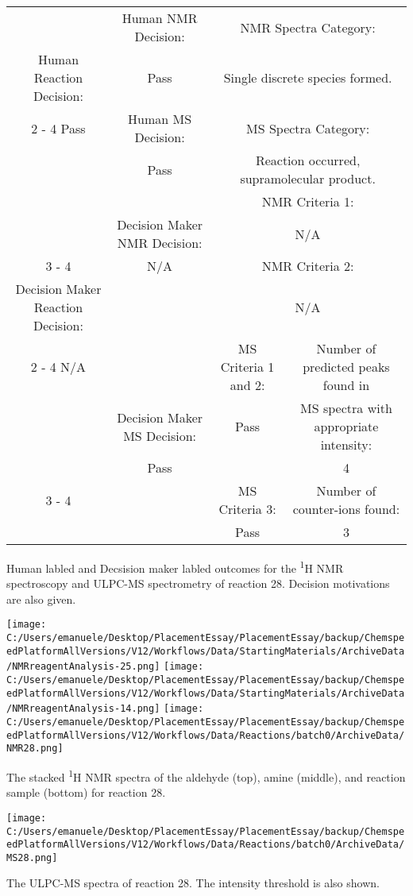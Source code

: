 \documentclass{article}%
\begin{document}
\begin{Decision Table}[H]%
\begin{tabular}{|c|c|c|c|}%
\hline%
&Human NMR Decision:&\multicolumn{2}{|c|}{NMR Spectra Category:}\\%
Human Reaction Decision:&Pass&\multicolumn{2}{|c|}{Single discrete species formed.}\\%
\cline{2%
-%
4}%
Pass&Human MS Decision:&\multicolumn{2}{|c|}{MS Spectra Category:}\\%
&Pass&\multicolumn{2}{|c|}{Reaction occurred, supramolecular product.}\\%
\hline%
&&\multicolumn{2}{|c|}{NMR Criteria 1:}\\%
&Decision Maker NMR Decision:&\multicolumn{2}{|c|}{N/A}\\%
\cline{3%
-%
4}%
&N/A&\multicolumn{2}{|c|}{NMR Criteria 2:}\\%
Decision Maker Reaction Decision:&&\multicolumn{2}{|c|}{N/A}\\%
\cline{2%
-%
4}%
N/A&&MS Criteria 1 and 2:&Number of predicted peaks found in\\%
&Decision Maker MS Decision:&Pass&MS spectra with appropriate intensity:\\%
&Pass&&4\\%
\cline{3%
-%
4}%
&&MS Criteria 3:&Number of counter{-}ions found:\\%
&&Pass&3\\%
\hline%
\end{tabular}%
\caption{Human labled and Decsision maker labled outcomes for the \textsuperscript{1}H NMR spectroscopy and ULPC-MS spectrometry of reaction 28. Decision motivations are also given.}%
\end{Decision Table}%
\begin{NMR Spectra}[H]%
\begin{center}%
\texttt{[image: C:/Users/emanuele/Desktop/PlacementEssay/PlacementEssay/backup/ChemspeedPlatformAllVersions/V12/Workflows/Data/StartingMaterials/ArchiveData/NMRreagentAnalysis-25.png]}\hfill%
\texttt{[image: C:/Users/emanuele/Desktop/PlacementEssay/PlacementEssay/backup/ChemspeedPlatformAllVersions/V12/Workflows/Data/StartingMaterials/ArchiveData/NMRreagentAnalysis-14.png]}\hfill%
\texttt{[image: C:/Users/emanuele/Desktop/PlacementEssay/PlacementEssay/backup/ChemspeedPlatformAllVersions/V12/Workflows/Data/Reactions/batch0/ArchiveData/NMR28.png]}\hfill%
\end{center}%
\caption{The stacked \textsuperscript{1}H NMR spectra of the aldehyde (top), amine (middle), and reaction sample (bottom) for reaction 28.}%
\end{NMR Spectra}%
\begin{MS Spectra}[H]%
\begin{center}%
\texttt{[image: C:/Users/emanuele/Desktop/PlacementEssay/PlacementEssay/backup/ChemspeedPlatformAllVersions/V12/Workflows/Data/Reactions/batch0/ArchiveData/MS28.png]}\hfill%
\end{center}%
\caption{The ULPC-MS spectra of reaction 28. The intensity threshold is also shown.}%
\end{MS Spectra}%
\end{document}
